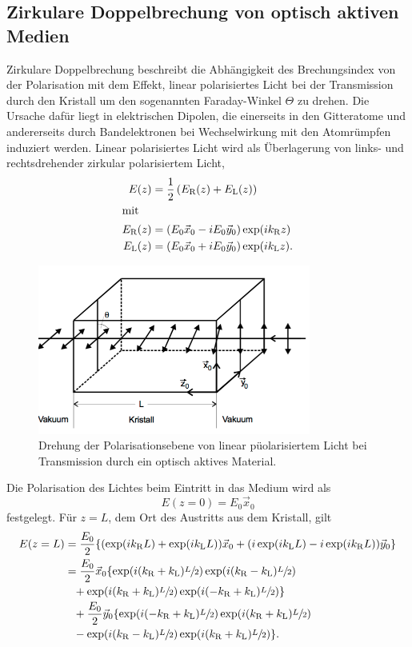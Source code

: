 \subsection{Zirkulare Doppelbrechung von optisch aktiven Medien}
\label{sec:doppel_aktiv}
Zirkulare Doppelbrechung beschreibt die Abhängigkeit des Brechungsindex von der Polarisation mit dem Effekt,
linear polarisiertes Licht bei der Transmission durch den Kristall um den sogenannten Faraday-Winkel $\Theta$ zu drehen.
Die Ursache dafür liegt in elektrischen Dipolen, die einerseits in den Gitteratome und
andererseits durch Bandelektronen bei Wechselwirkung mit den Atomrümpfen induziert werden.
Linear polarisiertes Licht wird als Überlagerung von links- und rechtsdrehender zirkular polarisiertem Licht,
\begin{align}
    E(z) &= \frac{1}{2} \left(E_\text{R}(z)+E_\text{L}(z)\right)\\
    \shortintertext{mit}
    E_\text{R}(z) &= (E_0 \vec x_0 - i E_0 \vec y_0) \exp(ik_\text{R}z)\\
    E_\text{L}(z) &= (E_0 \vec x_0 + i E_0 \vec y_0) \exp(ik_\text{L}z).
\end{align}
\begin{figure}[h]
    \centering
    \includegraphics[width=0.8\textwidth]{graphics/drehung.png}
    \caption{Drehung der Polarisationsebene von linear püolarisiertem Licht bei Transmission durch ein optisch aktives Material. \cite{skript}}
    \label{fig:drehung}
\end{figure}
Die Polarisation des Lichtes beim Eintritt in das Medium wird als
\begin{equation}
    E(z=0) = E_0 \vec x_0
\end{equation}
festgelegt.
Für $z = L$, dem Ort des Austritts aus dem Kristall, gilt
\begin{alignat*}{3}
    E(z=L) &= \frac{E_0}{2} \{ (\exp(ik_\text{R}L)+\exp(ik_\text{L}L))\vec x_0 + (i\exp(ik_\text{L}L)-i\exp(ik_\text{R}L))\vec y_0\}\\
    &= \frac{E_0}{2} \vec x_0 \{ \exp(i(k_\text{R}+k_\text{L})\sfrac{L}{2})\exp(i(k_\text{R}-k_\text{L})\sfrac{L}{2}) \\
    &\phantom{=} + \exp(i(k_\text{R}+k_\text{L})\sfrac{L}{2})\exp(i(-k_\text{R}+k_\text{L})\sfrac{L}{2})\}\\
    &\phantom{=}+ \frac{E_0}{2}\vec y_0 \{ \exp(i(-k_\text{R}+k_\text{L})\sfrac{L}{2})\exp(i(k_\text{R}+k_\text{L})\sfrac{L}{2}) \\
    &\phantom{=}- \exp(i(k_\text{R}-k_\text{L})\sfrac{L}{2})\exp(i(k_\text{R}+k_\text{L})\sfrac{L}{2}) \}.
\end{alignat*}
